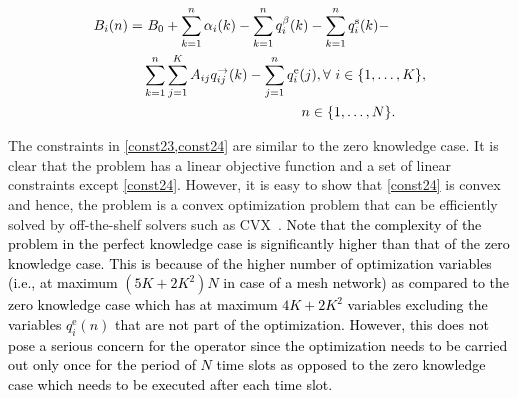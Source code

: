 \documentclass[10pt, letter,twocolumn]{IEEEtran}
\begin{document}
\begin{align}
  B_{i}(n) =&  \ B_{0} + \sum \limits_{k=1}^{n} \alpha_{i}(k) - \sum \limits_{k=1}^{n} q^{\beta}_{i}(k)  - \sum \limits_{k=1}^{n} q_{i}^{\text{s}}(k)  - \notag \\& \sum \limits_{k=1}^{n} \sum \limits_{j = 1}^{K} A_{ij} q^{\rightarrow}_{ij}(k)  - \sum \limits_{j=1}^{n} q_{i}^{\text{e}}(j), \forall \ i\in\{1,\ldots,K\}, \notag \\ & \hspace{4cm} n\in\{1,\ldots,N\}.
\end{align}\normalsize

The constraints in \cref{const23,const24} are similar to the zero knowledge case.
It is clear that the problem has a linear objective function and a set of linear constraints except \eqref{const24}. However, it is easy to show that \eqref{const24} is convex and hence, the problem is a convex optimization problem that can be efficiently solved by off-the-shelf solvers such as CVX~\cite{cvx}. \textcolor{black}{Note that the complexity of the problem in the perfect knowledge case is significantly higher than that of the zero knowledge case. This is because of the higher number of optimization variables (i.e., at maximum $(5K + 2K^{2})N$ in case of a mesh network) as compared to the zero knowledge case which has at maximum $4K + 2K^{2}$ variables excluding the variables $q_{i}^{\text{e}}(n)$ that are not part of the optimization.
However, this does not pose a serious concern for the operator since the optimization needs to be carried out only once for the period of $N$ time slots as opposed to the zero knowledge case which needs to be executed after each time slot.}
\end{document}
